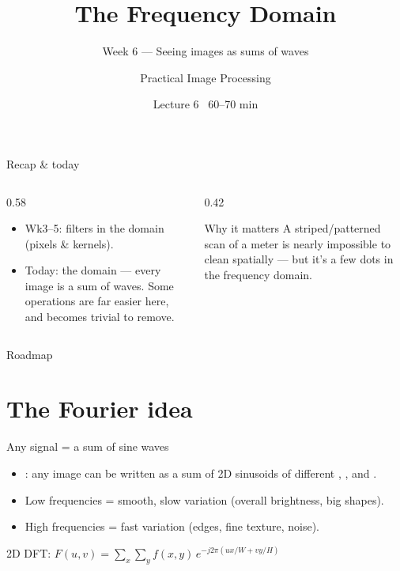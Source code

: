 \documentclass[10pt,aspectratio=169]{beamer}
\title{The Frequency Domain}
\subtitle{Week 6 — Seeing images as sums of waves}
\author{Practical Image Processing}
\date{Lecture 6 \textbullet\ 60--70 min}
\begin{document}
\maketitle

\begin{frame}{Recap \& today}
  \begin{columns}[T]
    \begin{column}{0.58\textwidth}
      \begin{itemize}
        \item Wk3--5: filters in the  domain (pixels \& kernels).
        \item \alert{Today:} the  domain — every image is a sum of waves. Some
              operations are far easier here, and  becomes trivial to remove.
      \end{itemize}
    \end{column}
    \begin{column}{0.42\textwidth}
      \begin{alertblock}{Why it matters}
        A striped/patterned scan of a meter is nearly impossible to clean spatially — but it's
        a few dots in the frequency domain.
      \end{alertblock}
    \end{column}
  \end{columns}
\end{frame}

\begin{frame}{Roadmap}\tableofcontents\end{frame}

\section{The Fourier idea}

\begin{frame}{Any signal = a sum of sine waves}
  \begin{itemize}
    \item {}: any image can be written as a sum of 2D sinusoids of different
          , , and .
    \item Low frequencies = smooth, slow variation (overall brightness, big shapes).
    \item High frequencies = fast variation (edges, fine texture, noise).
  \end{itemize}
  \begin{mathbox}
    2D DFT: $F(u,v)=\displaystyle\sum_{x}\sum_{y} f(x,y)\,e^{-j2\pi(ux/W + vy/H)}$
  \end{mathbox}
\end{frame}
\end{document}
